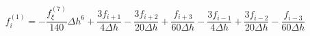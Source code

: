 \begin{equation} 
f^{{(1)}}_{i} = - \frac{f^{{(7)}}_{{\xi}}}{140} {\Delta h}^{6} + \frac{3 f_{{i+1}}}{4 {\Delta h}} - \frac{3 f_{{i+2}}}{20 {\Delta h}} + \frac{f_{{i+3}}}{60 {\Delta h}} - \frac{3 f_{{i-1}}}{4 {\Delta h}} + \frac{3 f_{{i-2}}}{20 {\Delta h}} - \frac{f_{{i-3}}}{60 {\Delta h}}
 \end{equation} 
